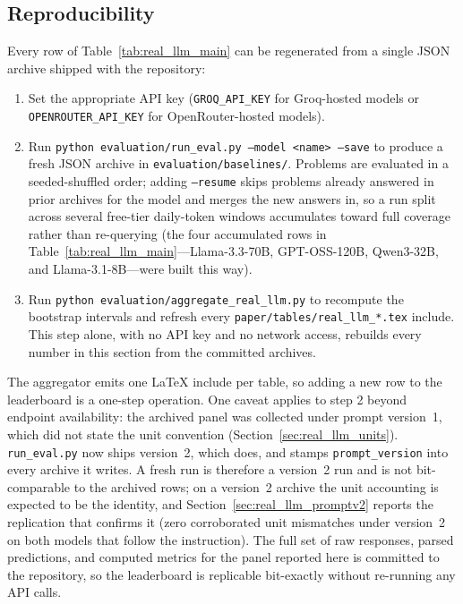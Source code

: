 \documentclass{article}
\begin{document}
\subsection{Reproducibility}
\label{sec:real_llm_repro}

Every row of Table~\ref{tab:real_llm_main} can be regenerated from a single JSON archive shipped with the repository:
\begin{enumerate}[leftmargin=*,itemsep=1pt]
\item Set the appropriate API key (\texttt{GROQ\_API\_KEY} for Groq-hosted models or \texttt{OPENROUTER\_API\_KEY} for OpenRouter-hosted models).
\item Run \texttt{python evaluation/run\_eval.py --model <name> --save} to produce a fresh JSON archive in \texttt{evaluation/baselines/}. Problems are evaluated in a seeded-shuffled order; adding \texttt{--resume} skips problems already answered in prior archives for the model and merges the new answers in, so a run split across several free-tier daily-token windows accumulates toward full coverage rather than re-querying (the four accumulated rows in Table~\ref{tab:real_llm_main}---Llama-3.3-70B, GPT-OSS-120B, Qwen3-32B, and Llama-3.1-8B---were built this way).
\item Run \texttt{python evaluation/aggregate\_real\_llm.py} to recompute the bootstrap intervals and refresh every \texttt{paper/tables/real\_llm\_*.tex} include. This step alone, with no API key and no network access, rebuilds every number in this section from the committed archives.
\end{enumerate}
The aggregator emits one LaTeX include per table, so adding a new row to the leaderboard is a one-step operation. One caveat applies to step 2 beyond endpoint availability: the archived panel was collected under prompt version~1, which did not state the unit convention (Section~\ref{sec:real_llm_units}). \texttt{run\_eval.py} now ships version~2, which does, and stamps \texttt{prompt\_version} into every archive it writes. A fresh run is therefore a version~2 run and is not bit-comparable to the archived rows; on a version~2 archive the unit accounting is expected to be the identity, and Section~\ref{sec:real_llm_promptv2} reports the replication that confirms it (zero corroborated unit mismatches under version~2 on both models that follow the instruction). The full set of raw responses, parsed predictions, and computed metrics for the panel reported here is committed to the repository, so the leaderboard is replicable bit-exactly without re-running any API calls.
\end{document}
